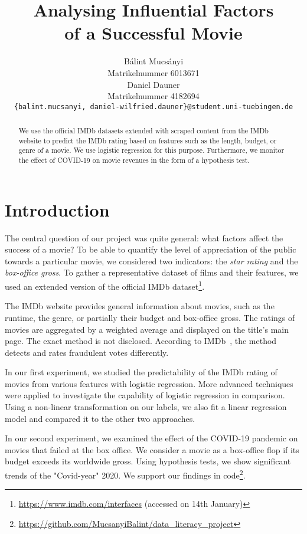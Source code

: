 \documentclass{article}
\title{Analysing Influential Factors\\of a Successful Movie}
\author{%
  Bálint Mucsányi\\
  Matrikelnummer 6013671\\
  \And
  Daniel Dauner\\
  Matrikelnummer 4182694\\
  \authorsmail
  \texttt{\{balint.mucsanyi, daniel-wilfried.dauner\}@student.uni-tuebingen.de} \\
}
\begin{document}
\maketitle

\begin{abstract}
  We use the official IMDb datasets extended with scraped content from the IMDb website to predict the IMDb rating based on features such as the length, budget, or genre of a movie. We use logistic regression for this purpose. Furthermore, we monitor the effect of COVID-19 on movie revenues in the form of a hypothesis test. %
\end{abstract}

\section{Introduction}
The central question of our project was quite general: what factors affect the success of a movie? To be able to quantify the level of appreciation of the public towards a particular movie, we considered two indicators: the \emph{star rating} and the \emph{box-office gross}. To gather a representative dataset of films and their features, we used an extended version of the official IMDb dataset\footnote{\url{https://www.imdb.com/interfaces} (accessed on 14th January)}.

The IMDb website provides general information about movies, such as the runtime, the genre, or partially their budget and box-office gross.
The ratings of movies are aggregated by a weighted average and displayed on the title's main page. The exact method is not disclosed. According to IMDb~\cite{ratings}, the method detects and rates fraudulent votes differently.

In our first experiment, we studied the predictability of the IMDb rating of movies from various features with logistic regression.
More advanced techniques were applied to investigate the capability of logistic regression in comparison. Using a non-linear transformation on our labels, we also fit a linear regression model and compared it to the other two approaches.

In our second experiment, we examined the effect of the COVID-19 pandemic on movies that failed at the box office. We consider a movie as a box-office flop if its budget exceeds its worldwide gross. Using hypothesis tests, we show significant trends of the "Covid-year" 2020. We support our findings in code\footnote{\url{https://github.com/MucsanyiBalint/data_literacy_project}}. %
\end{document}
